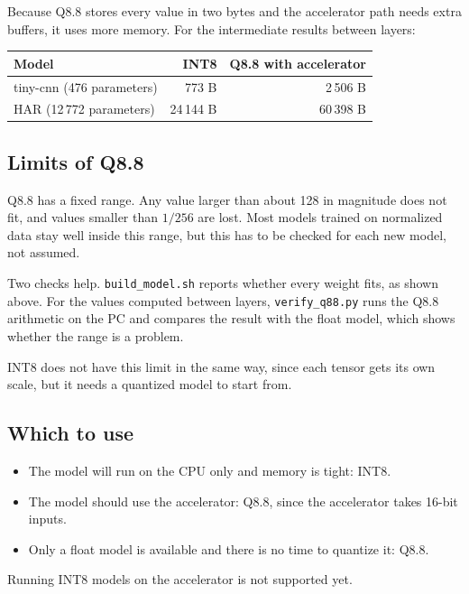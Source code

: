 \documentclass[11pt,a4paper]{article}
\begin{document}
Because Q8.8 stores every value in two bytes and the accelerator path needs
extra buffers, it uses more memory. For the intermediate results between
layers:

\begin{center}
\begin{tabular}{lrr}
\toprule
Model & INT8 & Q8.8 with accelerator \\
\midrule
tiny-cnn (476 parameters)   & 773 B     & 2\,506 B \\
HAR (12\,772 parameters)    & 24\,144 B & 60\,398 B \\
\bottomrule
\end{tabular}
\end{center}

\subsection{Limits of Q8.8}

Q8.8 has a fixed range. Any value larger than about 128 in magnitude does not
fit, and values smaller than $1/256$ are lost. Most models trained on
normalized data stay well inside this range, but this has to be checked for
each new model, not assumed.

Two checks help. \texttt{build\_model.sh} reports whether every weight fits,
as shown above. For the values computed between layers,
\texttt{verify\_q88.py} runs the Q8.8 arithmetic on the PC and compares the
result with the float model, which shows whether the range is a problem.

INT8 does not have this limit in the same way, since each tensor gets its own
scale, but it needs a quantized model to start from.

\subsection{Which to use}

\begin{itemize}
  \item The model will run on the CPU only and memory is tight: INT8.
  \item The model should use the accelerator: Q8.8, since the accelerator
    takes 16-bit inputs.
  \item Only a float model is available and there is no time to quantize it:
    Q8.8.
\end{itemize}

Running INT8 models on the accelerator is not supported yet.
\end{document}
